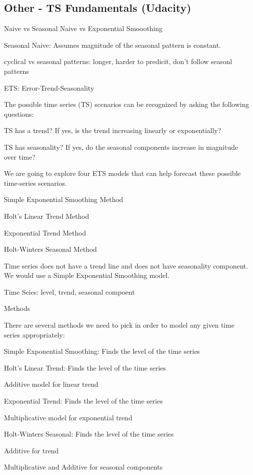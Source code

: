 \documentclass[]{book}
\theoremstyle{definition}
\theoremstyle{definition}
\theoremstyle{definition}
\theoremstyle{remark}
\begin{document}
\subsection{Other - TS Fundamentals
(Udacity)}\label{other---ts-fundamentals-udacity}

Naive vs Seasonal Naive vs Exponential Smooothing

Seasonal Naive: Assumes magnitude of the seasonal pattern is constant.

cyclical vs seasonal patterns: longer, harder to predicit, don't follow
seasonl patterns

ETS: Error-Trend-Seasonality

The possible time series (TS) scenarios can be recognized by asking the
following questions:

TS has a trend? If yes, is the trend increasing linearly or
exponentially?

TS has seasonality? If yes, do the seasonal components increase in
magnitude over time?

We are going to explore four ETS models that can help forecast these
possible time-series scenarios.

Simple Exponential Smoothing Method

Holt's Linear Trend Method

Exponential Trend Method

Holt-Winters Seasonal Method

Time series does not have a trend line and does not have seasonality
component. We would use a Simple Exponential Smoothing model.

Time Seies: level, trend, seasonal compoent

Methods

There are several methods we need to pick in order to model any given
time series appropriately:

Simple Exponential Smoothing: Finds the level of the time series

Holt's Linear Trend: Finds the level of the time series

Additive model for linear trend

Exponential Trend: Finds the level of the time series

Multiplicative model for exponential trend

Holt-Winters Seasonal: Finds the level of the time series

Additive for trend

Multiplicative and Additive for seasonal components
\end{document}
